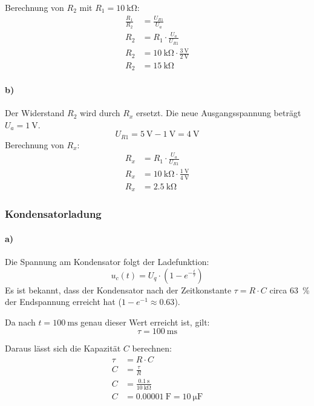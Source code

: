 \noindent Berechnung von $R_2$ mit $R_1 = \SI{10}{\kilo\ohm}$:
\begin{align*}
    \frac{R_1}{R_2} &= \frac{U_{R1}}{U_a} \\
    R_2 &= R_1 \cdot \frac{U_a}{U_{R1}} \\
    R_2 &= \SI{10}{\kilo\ohm} \cdot \frac{\SI{3}{\volt}}{\SI{2}{\volt}} \\
    R_2 &= \SI{15}{\kilo\ohm}
\end{align*}

\paragraph{b)}
Der Widerstand $R_2$ wird durch $R_x$ ersetzt. Die neue Ausgangsspannung beträgt $U_a = \SI{1}{\volt}$.
\[
    U_{R1} = \SI{5}{\volt} - \SI{1}{\volt} = \SI{4}{\volt}
\]
Berechnung von $R_x$:
\begin{align*}
    R_x &= R_1 \cdot \frac{U_a}{U_{R1}} \\
    R_x &= \SI{10}{\kilo\ohm} \cdot \frac{\SI{1}{\volt}}{\SI{4}{\volt}} \\
    R_x &= \SI{2.5}{\kilo\ohm}
\end{align*}

\subsubsection{Kondensatorladung}

\paragraph{a)} Die Spannung am Kondensator folgt der Ladefunktion:
\[
u_c(t) = U_q \cdot \left(1 - e^{-\frac{t}{\tau}}\right)
\]
Es ist bekannt, dass der Kondensator nach der Zeitkonstante $\tau = R \cdot C$ circa \SI{63}{\percent} der Endspannung erreicht hat ($1 - e^{-1} \approx 0.63$).

\noindent Da nach $t = \SI{100}{\milli\second}$ genau dieser Wert erreicht ist, gilt:
\[ \tau = \SI{100}{\milli\second} \]

\noindent Daraus lässt sich die Kapazität $C$ berechnen:
\begin{align*}
    \tau &= R \cdot C \\
    C &= \frac{\tau}{R} \\
    C &= \frac{\SI{0.1}{\second}}{\SI{10}{\kilo\ohm}} \\
    C &= \SI{0.00001}{\farad} = \SI{10}{\micro\farad}
\end{align*}

